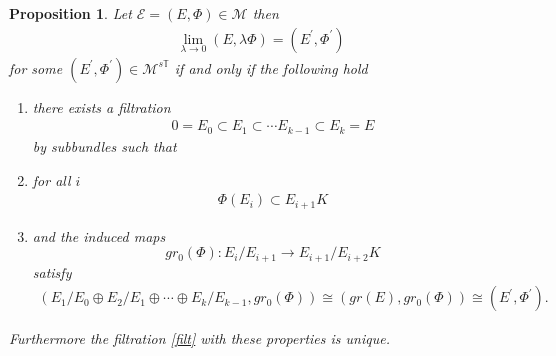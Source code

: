 \documentclass[12pt]{article}
\numberwithin{equation}{section}
\newtheorem{proposition}[theorem]{Proposition}
\theoremstyle{remark}
\theoremstyle{definition}
\numberwithin{theorem}{section}
\def\beq{\begin{eqnarray}}
\def\eeq{\end{eqnarray}}
\def\calE{{\mathcal E}}
\def\M{{\mathcal{M}}}
\newcommand{\T}{{\mathbb{T}}}
\renewcommand{\1}{\mathbbm{1}}
\begin{document}
\begin{proposition}\label{filtrationexists} Let $\calE=(E,\Phi)\in \M$ then \beq\label{limitdown}\lim_{\lambda\to 0} (E,\lambda\Phi)=(E^\prime,\Phi^\prime)\eeq for some   $(E^\prime,\Phi^\prime)\in \M^{s\T}$ if and only if the following hold \begin{enumerate} \item there exists a  filtration \beq\label{filt}0=E_0\subset E_1\subset \cdots E_{k-1}\subset E_k = E\eeq by subbundles such that \item for all $i$ \beq\label{compup}\Phi(E_i)\subset E_{i+1}K \eeq \item  and the induced maps $$gr_0(\Phi):E_i/E_{i+1}\to E_{i+1}/E_{i+2}K$$ satisfy \beq \label{limithiggs}(E_1/E_0\oplus E_2/E_1\oplus \cdots\oplus E_k/E_{k-1},gr_0(\Phi))\cong (gr(E),gr_0(\Phi))\cong(E^\prime,\Phi^\prime).\eeq \end{enumerate}
	Furthermore the filtration \eqref{filt} with these properties is unique. 
\end{proposition}
\end{document}
